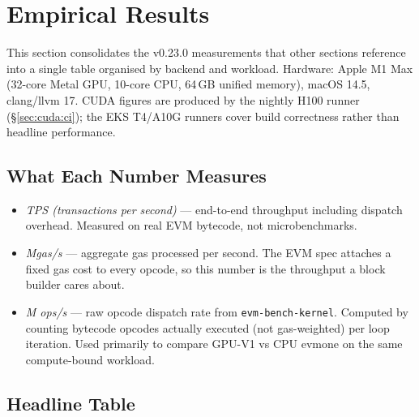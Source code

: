 \section{Empirical Results}

\label{sec:empirical}

This section consolidates the v0.23.0 measurements that other sections
reference into a single table organised by backend and workload.
Hardware: Apple M1 Max (32-core Metal GPU, 10-core CPU, 64\,GB unified
memory), macOS 14.5, clang/llvm 17. CUDA figures are produced by the
nightly H100 runner (\S\ref{sec:cuda:ci}); the EKS T4/A10G runners cover
build correctness rather than headline performance.

\subsection{What Each Number Measures}

\begin{itemize}
  \item \emph{TPS (transactions per second)} ---
    end-to-end throughput including dispatch overhead. Measured on
    real EVM bytecode, not microbenchmarks.
  \item \emph{Mgas/s} --- aggregate gas processed per second. The EVM
    spec attaches a fixed gas cost to every opcode, so this number is
    the throughput a block builder cares about.
  \item \emph{M ops/s} --- raw opcode dispatch rate from
    \texttt{evm-bench-kernel}. Computed by counting bytecode opcodes
    actually executed (not gas-weighted) per loop iteration. Used
    primarily to compare GPU-V1 vs CPU evmone on the same compute-bound
    workload.
\end{itemize}

\subsection{Headline Table}

